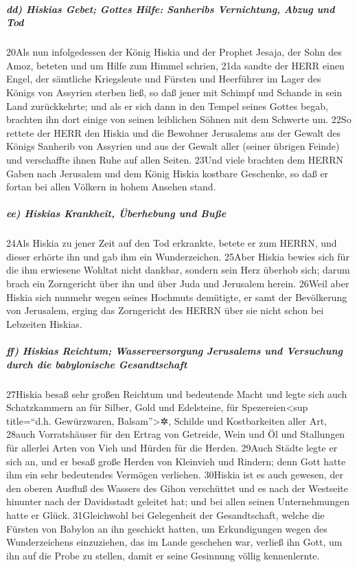 \hypertarget{dd-hiskias-gebet-gottes-hilfe-sanheribs-vernichtung-abzug-und-tod}{%
\subparagraph{dd) Hiskias Gebet; Gottes Hilfe: Sanheribs Vernichtung,
Abzug und
Tod}\label{dd-hiskias-gebet-gottes-hilfe-sanheribs-vernichtung-abzug-und-tod}}

20Als nun infolgedessen der König Hiskia und der Prophet Jesaja, der
Sohn des Amoz, beteten und um Hilfe zum Himmel schrien, 21da sandte der
HERR einen Engel, der sämtliche Kriegsleute und Fürsten und Heerführer
im Lager des Königs von Assyrien sterben ließ, so daß jener mit Schimpf
und Schande in sein Land zurückkehrte; und als er sich dann in den
Tempel seines Gottes begab, brachten ihn dort einige von seinen
leiblichen Söhnen mit dem Schwerte um. 22So rettete der HERR den Hiskia
und die Bewohner Jerusalems aus der Gewalt des Königs Sanherib von
Assyrien und aus der Gewalt aller (seiner übrigen Feinde) und
verschaffte ihnen Ruhe auf allen Seiten. 23Und viele brachten dem HERRN
Gaben nach Jerusalem und dem König Hiskia kostbare Geschenke, so daß er
fortan bei allen Völkern in hohem Ansehen stand.

\hypertarget{ee-hiskias-krankheit-uxfcberhebung-und-buuxdfe}{%
\subparagraph{ee) Hiskias Krankheit, Überhebung und
Buße}\label{ee-hiskias-krankheit-uxfcberhebung-und-buuxdfe}}

24Als Hiskia zu jener Zeit auf den Tod erkrankte, betete er zum HERRN,
und dieser erhörte ihn und gab ihm ein Wunderzeichen. 25Aber Hiskia
bewies sich für die ihm erwiesene Wohltat nicht dankbar, sondern sein
Herz überhob sich; darum brach ein Zorngericht über ihn und über Juda
und Jerusalem herein. 26Weil aber Hiskia sich nunmehr wegen seines
Hochmuts demütigte, er samt der Bevölkerung von Jerusalem, erging das
Zorngericht des HERRN über sie nicht schon bei Lebzeiten Hiskias.

\hypertarget{ff-hiskias-reichtum-wasserversorgung-jerusalems-und-versuchung-durch-die-babylonische-gesandtschaft}{%
\subparagraph{ff) Hiskias Reichtum; Wasserversorgung Jerusalems und
Versuchung durch die babylonische
Gesandtschaft}\label{ff-hiskias-reichtum-wasserversorgung-jerusalems-und-versuchung-durch-die-babylonische-gesandtschaft}}

27Hiskia besaß sehr großen Reichtum und bedeutende Macht und legte sich
auch Schatzkammern an für Silber, Gold und Edelsteine, für
Spezereien\textless sup title=``d.h. Gewürzwaren, Balsam''\textgreater✲,
Schilde und Kostbarkeiten aller Art, 28auch Vorratshäuser für den Ertrag
von Getreide, Wein und Öl und Stallungen für allerlei Arten von Vieh und
Hürden für die Herden. 29Auch Städte legte er sich an, und er besaß
große Herden von Kleinvieh und Rindern; denn Gott hatte ihm ein sehr
bedeutendes Vermögen verliehen. 30Hiskia ist es auch gewesen, der den
oberen Ausfluß des Wassers des Gihon verschüttet und es nach der
Westseite hinunter nach der Davidsstadt geleitet hat; und bei allen
seinen Unternehmungen hatte er Glück. 31Gleichwohl bei Gelegenheit der
Gesandtschaft, welche die Fürsten von Babylon an ihn geschickt hatten,
um Erkundigungen wegen des Wunderzeichens einzuziehen, das im Lande
geschehen war, verließ ihn Gott, um ihn auf die Probe zu stellen, damit
er seine Gesinnung völlig kennenlernte.

